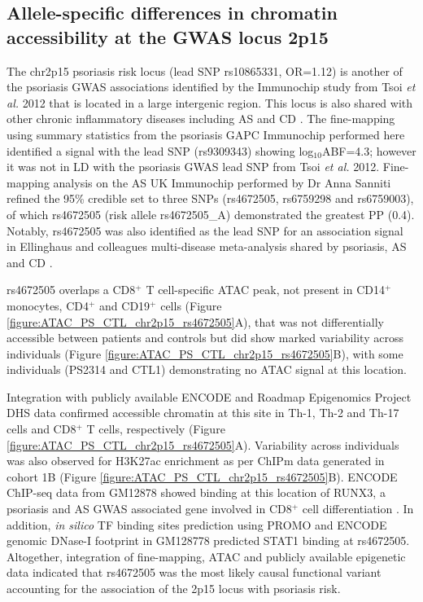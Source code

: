 \subsection{Allele-specific differences in chromatin accessibility at the GWAS locus 2p15}
The chr2p15 psoriasis risk locus (lead SNP rs10865331, OR=1.12) is another of the psoriasis GWAS associations identified by the Immunochip study from Tsoi \textit{et al.} 2012 that is located in a large intergenic region. This locus is also shared with other chronic inflammatory diseases including AS and CD \parencite{Cortes2013,Jostins2012}. The fine-mapping using summary statistics from the psoriasis GAPC Immunochip performed here identified a signal with the lead SNP (rs9309343) showing log$_{10}$ABF=4.3; however it was not in LD with the psoriasis GWAS lead SNP from Tsoi \textit{et al.} 2012. Fine-mapping analysis on the AS UK Immunochip performed by Dr Anna Sanniti refined the 95\% credible set to three SNPs (rs4672505, rs6759298 and rs6759003), of which rs4672505 (risk allele rs4672505\_A) demonstrated the greatest PP (0.4). Notably, rs4672505 was also identified as the lead SNP for an association signal in Ellinghaus and colleagues multi-disease meta-analysis shared by psoriasis, AS and CD \parencite{Ellinghaus2016}.

rs4672505 overlaps a CD8$^+$ T cell-specific ATAC peak, not present in CD14$^+$ monocytes, CD4$^+$ and CD19$^+$ cells (Figure \ref{figure:ATAC_PS_CTL_chr2p15_rs4672505}A), that was not differentially accessible between patients and controls but did show marked variability across individuals (Figure \ref{figure:ATAC_PS_CTL_chr2p15_rs4672505}B), with some individuals (PS2314 and CTL1) demonstrating no ATAC signal at this location. 

Integration with publicly available ENCODE and Roadmap Epigenomics Project DHS data confirmed accessible chromatin at this site in Th-1, Th-2 and Th-17 cells and CD8$^+$ T cells, respectively (Figure \ref{figure:ATAC_PS_CTL_chr2p15_rs4672505}A). Variability across individuals was also observed for H3K27ac enrichment as per ChIPm data generated in cohort 1B (Figure \ref{figure:ATAC_PS_CTL_chr2p15_rs4672505}B). ENCODE ChIP-seq data from GM12878 showed binding at this location of RUNX3, a psoriasis and AS GWAS associated gene involved in CD8$^+$ cell differentiation \parencite{Wong2011}. In addition, \textit{in silico} TF binding sites prediction using PROMO \parencite{Messeguer2002} and ENCODE genomic DNase-I footprint in GM128778 predicted STAT1 binding at rs4672505. Altogether, integration of fine-mapping, ATAC and publicly available epigenetic data indicated that rs4672505 was the most likely causal functional variant accounting for the association of the 2p15 locus with psoriasis risk.


